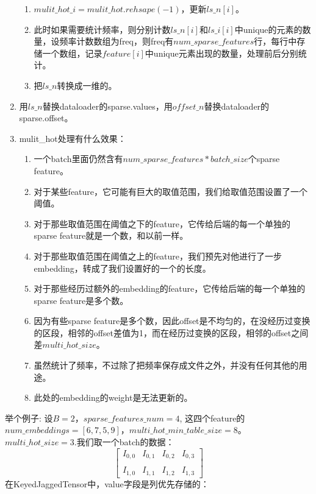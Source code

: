 \documentclass{article}
\begin{document}
\begin{enumerate}
\begin{enumerate}
        \item $mulit\_hot\_i = mulit\_hot.rehsape(-1)$，更新$ls\_n[i]$。
        \item 此时如果需要统计频率，则分别计数$ls\_n[i]$和$ls\_i[i]$中unique的元素的数量，设频率计数数组为freq，则freq有$num\_sparse\_features$行，每行中存储一个数组，记录$feature[i]$中unique元素出现的数量，处理前后分别统计。
        \item 把$ls\_n$转换成一维的。
    \end{enumerate}
    \item 用$ls\_n$替换dataloader的sparse.values，用$offset\_n$替换dataloader的sparse.offset。
    \item mulit\_hot处理有什么效果：
    \begin{enumerate}
        \item 一个batch里面仍然含有$num\_sparse\_features*batch\_size$个sparse feature。
        \item 对于某些feature，它可能有巨大的取值范围，我们给取值范围设置了一个阈值。
        \item 对于那些取值范围在阈值之下的feature，它传给后端的每一个单独的sparse feature就是一个数，和以前一样。
        \item 对于那些取值范围在阈值之上的feature，我们预先对他进行了一步embedding，转成了我们设置好的一个的长度。
        \item 对于那些经历过额外的embedding的feature，它传给后端的每一个单独的sparse feature是多个数。
        \item 因为有些sparse feature是多个数，因此offset是不均匀的，在没经历过变换的区段，相邻的offset差值为1，而在经历过变换的区段，相邻的offset之间差$multi\_hot\_size$。
        \item 虽然统计了频率，不过除了把频率保存成文件之外，并没有任何其他的用途。
        \item 此处的embedding的weight是无法更新的。
    \end{enumerate}
\end{enumerate}
举个例子:\newline
设$B=2$，$sparse\_features\_num = 4$, 这四个feature的$num\_embeddings=[6,7,5,9]$，\newline$multi\_hot\_min\_table\_size = 8$。
$multi\_hot\_size=3$.我们取一个batch的数据：
$$
\begin{bmatrix}
    I_{0,0} & I_{0,1} & I_{0,2} & I_{0,3} \\\\
    I_{1,0} & I_{1,1} & I_{1,2} & I_{1,3}
\end{bmatrix}
$$
在KeyedJaggedTensor中，value字段是列优先存储的：
\end{document}
